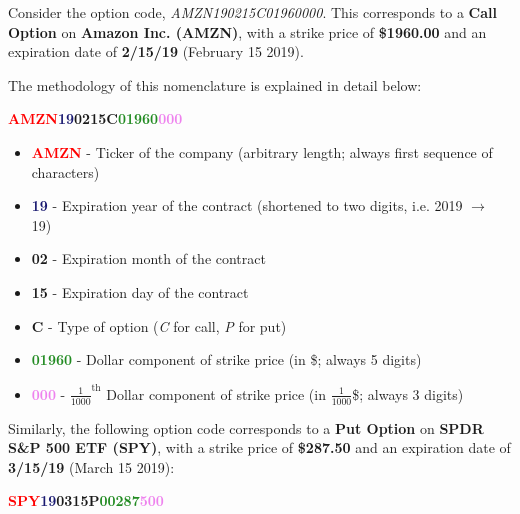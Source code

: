 \documentclass[10pt]{article}
\begin{document}
        Consider the option code, \textit{AMZN190215C01960000}. This corresponds to a \textbf{Call Option} on \textbf{Amazon Inc. (AMZN)}, with a strike price of \textbf{\$1960.00} and an expiration date of \textbf{2/15/19} (February 15 2019).
        
        The methodology of this nomenclature is explained in detail below:
    
        \pagebreak[3]

        \begin{center}
            \textbf{\textcolor{red}{AMZN}\textcolor{MidnightBlue}{19}\textcolor{Bittersweet}{02}\textcolor{YellowOrange}{15}\textcolor{RoyalPurple}{C}\textcolor{ForestGreen}{01960}\textcolor{violet}{000}}
        \end{center}
    
        \begin{itemize}
            \item \textbf{\textcolor{red}{AMZN}} - Ticker of the company (arbitrary length; always first sequence of characters)
            \item \textbf{\textcolor{MidnightBlue}{19}} - Expiration year of the contract (shortened to two digits, i.e. 2019 $\rightarrow$ 19)
            \item \textbf{\textcolor{Bittersweet}{02}} - Expiration month of the contract
            \item \textbf{\textcolor{YellowOrange}{15}} - Expiration day of the contract
            \item \textbf{\textcolor{RoyalPurple}{C}} - Type of option (\textit{C} for call, \textit{P} for put)
            \item \textbf{\textcolor{ForestGreen}{01960}} - Dollar component of strike price (in \$; always 5 digits)
            \item \textbf{\textcolor{violet}{000}} - ${\frac{1}{1000}}^\text{th}$ Dollar component of strike price (in $\frac{1}{1000}$\$; always 3 digits)
        \end{itemize}
    
        Similarly, the following option code corresponds to a \textbf{Put Option} on \textbf{SPDR S\&P 500 ETF (SPY)}, with a strike price of \textbf{\$287.50} and an expiration date of \textbf{3/15/19} (March 15 2019):
    
        \begin{center}
            \textbf{\textcolor{red}{SPY}\textcolor{MidnightBlue}{19}\textcolor{Bittersweet}{03}\textcolor{YellowOrange}{15}\textcolor{RoyalPurple}{P}\textcolor{ForestGreen}{00287}\textcolor{violet}{500}}
        \end{center}
    
\end{document}
